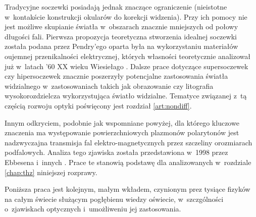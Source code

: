 Tradycyjne soczewki posiadają jednak znaczące ograniczenie (nieistotne w~kontakście konstrukcji okularów do korekcji widzenia). Przy ich pomocy nie jest możliwe skupianie światła w~obszarach znacznie mniejszych od połowy długości fali. Pierwsza propozycja teoretyczna stworzenia idealnej soczewki została podana przez Pendry'ego \cite{PhysRevLett.85.3966} oparta była na wykorzystaniu materiałów oujemnej przenikalności elektrycznej, których własności teoretycznie analizował już w~latach '60 XX wieku Wiesiełago \cite{veselago1968electrodynamics}. Dalsze prace dotyczące supersoczewek czy hipersoczewek \cite{liu2007far} znacznie poszerzyły potencjalne zastosowania światła widzialnego w~zastosowaniach takich jak  obrazowanie czy litografia wysokorozdzielcza wykorzystująca światło widzialne. Tematyce związanej z~tą częścią rozwoju optyki poświęcony jest rozdział \ref{art:nondiff}.

Innym odkryciem, podobnie jak wspomniane powyżej, dla którego kluczowe znaczenia ma występowanie powierzchniowych plazmonów polarytonów jest nadzwyczajna transmisja fal elektro-magnetycznych przez szczeliny orozmiarach podfalowych. Analiza tego zjawiska została przedstawiona w~1998 przez Ebbesena i~innych \cite{ebbesen1998extraordinary,1998APS..MAR.S1511E}. Prace te stanowią podstawę dla analizowanych w~rozdziale \ref{chap:thz} niniejszej rozprawy.

Poniższa praca jest kolejnym, małym wkładem, czynionym prez tysiące fizyków na całym świecie służącym pogłębienu wiedzy oświecie, w~szczgólności o~zjawiskach optycznych i~umożliweniu jej zastosowania.
